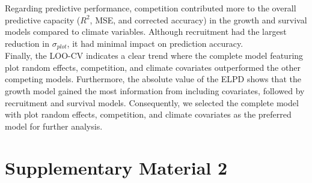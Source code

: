 Regarding predictive performance, competition contributed more to the
overall predictive capacity (\(R^2\), MSE, and corrected accuracy) in
the growth and survival models compared to climate variables. Although
recruitment had the largest reduction in \(\sigma_{plot}\), it had
minimal impact on prediction accuracy.\\

Finally, the LOO-CV indicates a clear trend where the complete model
featuring plot random effects, competition, and climate covariates
outperformed the other competing models. Furthermore, the absolute value
of the ELPD shows that the growth model gained the most information from
including covariates, followed by recruitment and survival models.
Consequently, we selected the complete model with plot random effects,
competition, and climate covariates as the preferred model for further
analysis.\\

\newpage

\hypertarget{supplementary-material-2}{%
\section{Supplementary Material 2}\label{supplementary-material-2}}

